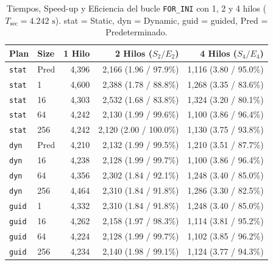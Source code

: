 \documentclass[12pt]{article}
\begin{document}
\begin{enumerate}
\begin{table}[htbp]
    \centering
    \small
    \begin{tabular}{llrrr}
        \toprule
        \textbf{Plan} & \textbf{Size} & \textbf{1 Hilo} & \textbf{2 Hilos ($S_2 / E_2$)} & \textbf{4 Hilos ($S_4 / E_4$)} \\
        \midrule
        \texttt{stat} & Pred & 4,396 & 2,166 (1.96 / 97.9\%) & 1,116 (3.80 / 95.0\%) \\
        \texttt{stat} & 1    & 4,600 & 2,388 (1.78 / 88.8\%) & 1,268 (3.35 / 83.6\%) \\
        \texttt{stat} & 16   & 4,303 & 2,532 (1.68 / 83.8\%) & 1,324 (3.20 / 80.1\%) \\
        \texttt{stat} & 64   & 4,242 & 2,130 (1.99 / 99.6\%) & 1,100 (3.86 / 96.4\%) \\
        \texttt{stat} & 256  & 4,242 & 2,120 (2.00 / 100.0\%) & 1,130 (3.75 / 93.8\%) \\
        \midrule
        \texttt{dyn} & Pred  & 4,210 & 2,132 (1.99 / 99.5\%) & 1,210 (3.51 / 87.7\%) \\
        \texttt{dyn} & 16    & 4,238 & 2,128 (1.99 / 99.7\%) & 1,100 (3.86 / 96.4\%) \\
        \texttt{dyn} & 64    & 4,356 & 2,302 (1.84 / 92.1\%) & 1,248 (3.40 / 85.0\%) \\
        \texttt{dyn} & 256   & 4,464 & 2,310 (1.84 / 91.8\%) & 1,286 (3.30 / 82.5\%) \\
        \midrule
        \texttt{guid} & 1    & 4,332 & 2,310 (1.84 / 91.8\%) & 1,248 (3.40 / 85.0\%) \\
        \texttt{guid} & 16   & 4,262 & 2,158 (1.97 / 98.3\%) & 1,114 (3.81 / 95.2\%) \\
        \texttt{guid} & 64   & 4,224 & 2,128 (1.99 / 99.7\%) & 1,102 (3.85 / 96.2\%) \\
        \texttt{guid} & 256  & 4,234 & 2,140 (1.98 / 99.1\%) & 1,124 (3.77 / 94.3\%) \\
        \bottomrule
    \end{tabular}
    \caption{Tiempos, Speed-up y Eficiencia del bucle \texttt{FOR\_INI} con 1, 2 y 4 hilos ($T_{\text{sec}} = 4.242\text{ s}$). stat = Static, dyn = Dynamic, guid = guided, Pred = Predeterminado.}
    \label{tab:scheduling_for_ini}
\end{table}


\end{enumerate}
\end{document}
